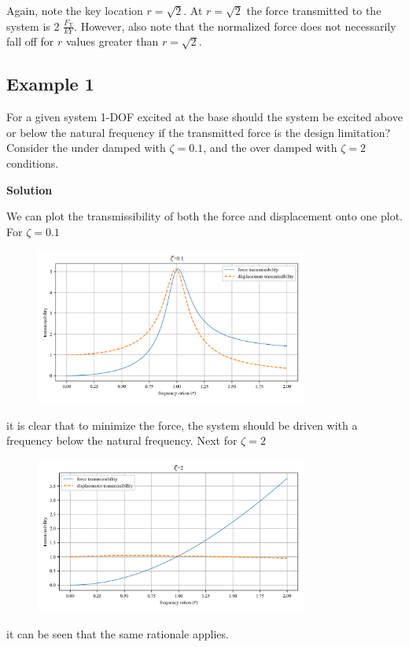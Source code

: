 \documentclass[12pt,a4paper]{article}
\begin{document}
Again, note the key location $r=\sqrt{2}$. At $r=\sqrt{2}$ the force transmitted to the system is 2 $\frac{F_\text{T}}{kY}$. However, also note that the normalized force does not necessarily fall off for $r$ values greater than $r=\sqrt{2}$.  

		\subsection*{Example 1}

			For a given system 1-DOF excited at the base should the system be excited above or below the natural frequency if the transmitted force is the design limitation? Consider the under damped with $\zeta=0.1$, and the over damped with $\zeta=2$ conditions. 

			\textbf{Solution}
			
			We can plot the transmissibility of both the force and displacement onto one plot. For $\zeta=0.1$
			\begin{figure}[H]
				\centering
				\includegraphics[width=0.8\textwidth]{../../Figures/example_1_force_displacement_transmissibility_1.png}
			\end{figure}
			it is clear that to minimize the force, the system should be driven with a frequency below the natural frequency. Next for  $\zeta=2$
			\begin{figure}[H]
				\centering
				\includegraphics[width=0.8\textwidth]{../../Figures/example_1_force_displacement_transmissibility_2.png}
			\end{figure}			
			it can be seen that the same rationale applies. 
			
\end{document}

